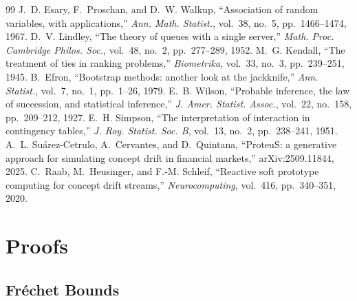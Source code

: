 \documentclass[10pt,conference]{IEEEtran}
\theoremstyle{definition}
\begin{document}
\begin{thebibliography}{99}
 J.~D. Esary, F.~Proschan, and D.~W. Walkup, ``Association of random variables, with applications,'' \emph{Ann. Math. Statist.}, vol.~38, no.~5, pp.~1466--1474, 1967.
 D.~V. Lindley, ``The theory of queues with a single server,'' \emph{Math. Proc. Cambridge Philos. Soc.}, vol.~48, no.~2, pp.~277--289, 1952.
 M.~G. Kendall, ``The treatment of ties in ranking problems,'' \emph{Biometrika}, vol.~33, no.~3, pp.~239--251, 1945.
 B.~Efron, ``Bootstrap methods: another look at the jackknife,'' \emph{Ann. Statist.}, vol.~7, no.~1, pp.~1--26, 1979.
 E.~B. Wilson, ``Probable inference, the law of succession, and statistical inference,'' \emph{J. Amer. Statist. Assoc.}, vol.~22, no.~158, pp.~209--212, 1927.
 E.~H. Simpson, ``The interpretation of interaction in contingency tables,'' \emph{J. Roy. Statist. Soc. B}, vol.~13, no.~2, pp.~238--241, 1951.
 A.~L. Suárez-Cetrulo, A.~Cervantes, and D.~Quintana, ``ProteuS: a generative approach for simulating concept drift in financial markets,'' arXiv:2509.11844, 2025.
 C.~Raab, M.~Heusinger, and F.-M. Schleif, ``Reactive soft prototype computing for concept drift streams,'' \emph{Neurocomputing}, vol.~416, pp.~340--351, 2020.
\end{thebibliography}

\appendices

\section{Proofs}
\label{app:proofs}

\subsection{Fréchet Bounds}
\end{document}
